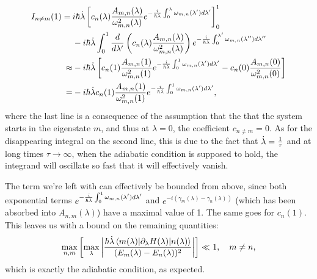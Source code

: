     \begin{equation}\label{eq:final_adiabatic_integral}
        \begin{aligned}
            I_{n \neq m}(1) = \: &i\hbar \dot{\lambda} \left[ c_n(\lambda) \frac{A_{m,n}(\lambda)}{\omega_{m,n}^2(\lambda)} e^{-\frac{i}{\hbar \dot{\lambda}}\int_0^{\lambda}\omega_{m,n}(\lambda')d \lambda'}  \right]_0^1 \\ 
            \quad &-i\hbar \dot{\lambda} \int_0^1 \frac{d}{d\lambda'} \left(c_n(\lambda) \frac{A_{m,n}(\lambda)}{\omega_{m,n}^2(\lambda)} \right) e^{-\frac{i}{\hbar \dot{\lambda}}\int_0^{\lambda'}\omega_{m,n}(\lambda'')d \lambda''} \\
            \approx &-i\hbar \dot{\lambda} \left[ c_n(1) \frac{A_{m,n}(1)}{\omega_{m,n}^2(1)}e^{-\frac{i}{\hbar \dot{\lambda}}\int_0^{1}\omega_{m,n}(\lambda')d \lambda'} - c_n(0) \frac{A_{m,n}(0)}{\omega_{m,n}^2(0)} \right] \\
            = &-i\hbar \dot{\lambda} c_n(1) \frac{A_{m,n}(1)}{\omega_{m,n}^2(1)}e^{-\frac{i}{\hbar \dot{\lambda}}\int_0^{1}\omega_{m,n}(\lambda')d \lambda'},
        \end{aligned}
    \end{equation}
    where the last line is a consequence of the assumption that the that the system starts in the eigenstate $m$, and thus at $\lambda = 0$, the coefficient $c_{n \neq m} = 0$. As for the disappearing integral on the second line, this is due to the fact that $\dot{\lambda} = \frac{1}{\tau}$ and at long times $\tau \rightarrow \infty$, when the adiabatic condition is supposed to hold, the integrand will oscillate so fast that it will effectively vanish\cite{kahane_generalizations_1980}. 

    The term we're left with can effectively be bounded from above, since both exponential terms $e^{-\frac{i}{\hbar \dot{\lambda}}\int_0^{1}\omega_{m,n}(\lambda')d \lambda'}$ and $e^{-i(\gamma_m(\lambda) - \gamma_n(\lambda))}$ (which has been absorbed into $A_{n,m}(\lambda)$) have a maximal value of 1. The same goes for $c_n(1)$. This leaves us with a bound on the remaining quantities:
    \begin{equation}\label{eq:adiabatic_criterion}
        \max _{n,m}\left[\max_{\lambda} \left| \frac{\hbar \dot{\lambda} \mel{m(\lambda)}{\partial_{\lambda}H(\lambda)}{n(\lambda)}}{(E_m(\lambda) - E_n(\lambda))^2} \right| \right] \ll 1, \quad m \neq n,
    \end{equation}
    which is exactly the adiabatic condition, as expected. 

